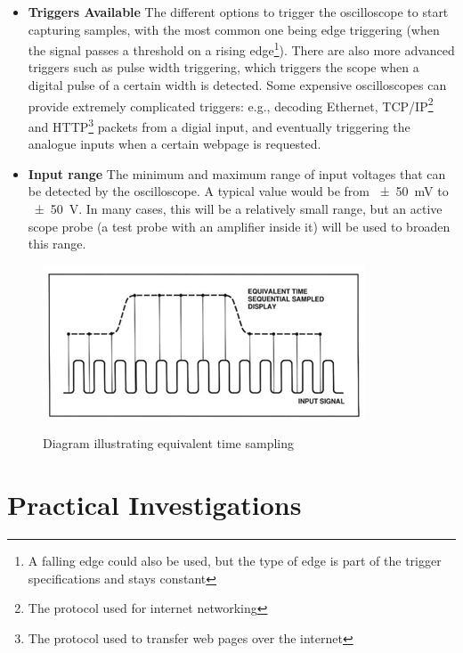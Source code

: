 \begin{itemize}
  \item \textbf{Triggers Available} The different options to trigger the
    oscilloscope to start capturing samples, with the most common one being edge
    triggering \autocite{PicotechTriggers} (when the signal passes a threshold
    on a rising edge\footnote{A falling edge could also be used, but the type of
    edge is part of the trigger specifications and stays constant}). There are
    also more advanced triggers such as pulse width triggering, which triggers
    the scope when a digital pulse of a certain width is detected. Some
    expensive oscilloscopes can provide extremely complicated triggers: e.g.,
    decoding Ethernet, TCP/IP\footnote{The protocol used for internet
    networking} and HTTP\footnote{The protocol used to transfer web pages over
    the internet} packets from a digial input, and eventually triggering the
    analogue inputs when a certain webpage is requested.

  \item \textbf{Input range} The minimum and maximum range of input voltages
    that can be detected by the oscilloscope. A typical value would be from
    \SI{\pm 50}{\mV} to \SI{\pm 50}{\V}. In many cases, this will be a
    relatively small range, but an active scope probe (a test probe with an
    amplifier inside it) will be used to broaden this range.

\end{itemize}

\begin{figure}
  \centering
  \includegraphics{img/equivalent_time_sampling.png}
  \label{fig:EquivalentTimeSampling}
  \caption[Equivalent Time Sampling Diagram]{Diagram illustrating equivalent time sampling ~\autocite{fig:EquivalentTimeSampling}}
\end{figure}

\section{Practical Investigations}

